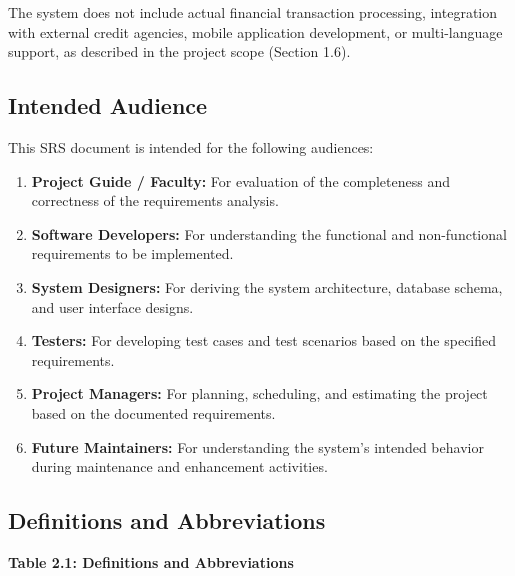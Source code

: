 The system does not include actual financial transaction processing, integration with external credit agencies, mobile application development, or multi-language support, as described in the project scope (Section 1.6).

\subsection{Intended Audience}

This SRS document is intended for the following audiences:

\begin{enumerate}
  \item \textbf{Project Guide / Faculty:} For evaluation of the completeness and correctness of the requirements analysis.
  \item \textbf{Software Developers:} For understanding the functional and non-functional requirements to be implemented.
  \item \textbf{System Designers:} For deriving the system architecture, database schema, and user interface designs.
  \item \textbf{Testers:} For developing test cases and test scenarios based on the specified requirements.
  \item \textbf{Project Managers:} For planning, scheduling, and estimating the project based on the documented requirements.
  \item \textbf{Future Maintainers:} For understanding the system's intended behavior during maintenance and enhancement activities.
\end{enumerate}

\subsection{Definitions and Abbreviations}

\textbf{Table 2.1: Definitions and Abbreviations}

